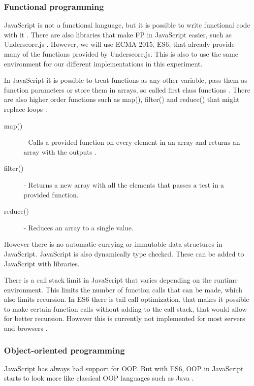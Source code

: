 \documentclass {article}
\begin{document}
\subsubsection{Functional programming}
\label{sec:js-fp}
JavaScript is not a functional language, but it is possible to write functional code with it \cite{drboolean}. There are also libraries that make FP in JavaScript easier, such as Underscore.js \cite{underscorejs} \cite{fogus}. However, we will use ECMA 2015, ES6, that already provide many of the functions provided by Underscore.js. This is also to use the same environment for our different implementations in this experiment.
 
In JavaScript it is possible to treat functions as any other variable, pass them as function parameters or store them in arrays, so called first class functions \cite{drboolean}. There are also higher order functions such as map(), filter() and reduce() that might replace loops \cite{grady}:
 
\begin{description}
\item [map()] - Calls a provided function on every element in an array and returns an array with the outputs \cite{jsref}.
\item [filter()] - Returns a new array with all the elements that passes a test in a provided function. 
\item [reduce()] - Reduces an array to a single value.
\end{description}
 
However there is no automatic currying or immutable data structures in JavaScript. JavaScript is also dynamically type checked. These can be added to JavaScript with libraries.
 
There is a call stack limit in JavaScript that varies depending on the runtime environment. This limits the number of function calls that can be made, which also limits recursion. In ES6 there is tail call optimization, that makes it possible to make certain function calls without adding to the call stack, that would allow for better recursion. However this is currently not implemented for most servers and browsers \cite{ecma6table}.
\subsubsection{Object-oriented programming}
JavaScript has always had support for OOP. But 
with ES6, OOP in JavaScript starts to look more like classical OOP languages such as Java \cite{ecmacompare}.
 
\end{document}
